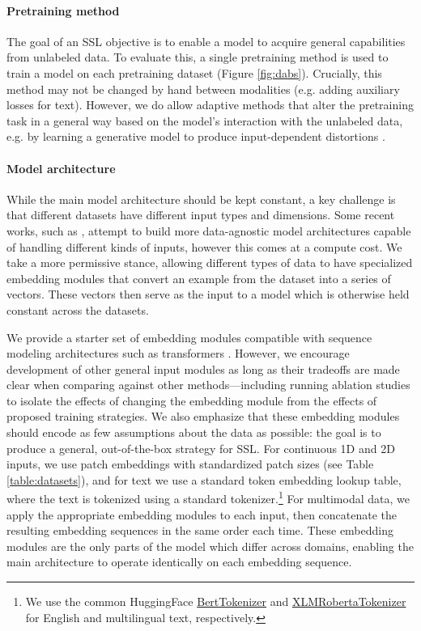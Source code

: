 \documentclass{article}
\begin{document}
\paragraph{Pretraining method} The goal of an SSL objective is to enable a model to acquire general capabilities from unlabeled data. To evaluate this, a single pretraining method is used to train a model on each pretraining dataset (Figure \ref{fig:dabs}). Crucially, this method may not be changed by hand between modalities (e.g. adding auxiliary losses for text). However, we do allow adaptive methods that alter the pretraining task in a general way based on the model's interaction with the unlabeled data, e.g. by learning a generative model to produce input-dependent distortions \citep{Tamkin2020ViewmakerNL}.

\paragraph{Model architecture} While the main model architecture should be kept constant, a key challenge is that different datasets have different input types and dimensions. Some recent works, such as \citet{Jaegle2021PerceiverGP}, attempt to build more data-agnostic model architectures capable of handling different kinds of inputs, however this comes at a compute cost. We take a more permissive stance, allowing different types of data to have specialized embedding modules that convert an example from the dataset into a series of vectors. These vectors then serve as the input to a model which is otherwise held constant across the datasets. 

We provide a starter set of embedding modules compatible with sequence modeling architectures such as transformers \citep{Vaswani2017AttentionIA}. However, we encourage development of other general input modules as long as their tradeoffs are made clear when comparing against other methods---including running ablation studies to isolate the effects of changing the embedding module from the effects of proposed training strategies. We also emphasize that these embedding modules should encode as few assumptions about the data as possible: the goal is to produce a general, out-of-the-box strategy for SSL. For continuous 1D and 2D inputs, we use patch embeddings \citep{Dosovitskiy2020AnII} with standardized patch sizes (see Table \ref{table:datasets}), and for text we use a standard token embedding lookup table, where the text is tokenized using a standard tokenizer.\footnote{We use the common HuggingFace \href{https://huggingface.co/transformers/model_doc/bert.html}{BertTokenizer} and \href{https://huggingface.co/transformers/model_doc/xlmroberta.html}{XLMRobertaTokenizer} for English and multilingual text, respectively.} For multimodal data, we apply the appropriate embedding modules to each input, then concatenate the resulting embedding sequences in the same order each time. These embedding modules are the only parts of the model which differ across domains, enabling the main architecture to operate identically on each embedding sequence.
\end{document}
